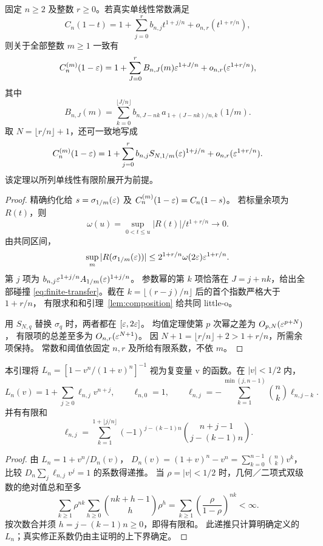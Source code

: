 \begin{theorem}[固定有限阶的条件性传递]\label{thm:finite-transfer}
固定 \(n\ge2\) 及整数 \(r\ge0\)。若真实单线性常数满足
\[
 C_n(1-t)=1+\sum_{j=0}^r b_{n,j}t^{1+j/n}
                         +o_{n,r}(t^{1+r/n}),
\]
则关于全部整数 \(m\ge1\) 一致有
\[
 C_n^{(m)}(1-\varepsilon)
 =1+\sum_{J=0}^r B_{n,J}(m)\varepsilon^{1+J/n}
                         +o_{n,r}(\varepsilon^{1+r/n}),
\]
其中
\begin{equation}\label{eq:finite-transfer}
 B_{n,J}(m)=
 \sum_{k=0}^{\lfloor J/n\rfloor}
 b_{n,J-nk}\,
 a_{\,1+(J-nk)/n,k}(1/m).
\end{equation}
取 \(N=\lfloor r/n\rfloor+1\)，还可一致地写成
\[
 C_n^{(m)}(1-\varepsilon)
 =1+\sum_{j=0}^r b_{n,j}S_{N,1/m}(\varepsilon)^{1+j/n}
                         +o_{n,r}(\varepsilon^{1+r/n}).
\]
该定理以所列单线性有限阶展开为前提。
\end{theorem}
\begin{proof}
精确约化给 \(s=\sigma_{1/m}(\varepsilon)\) 及
\(C_n^{(m)}(1-\varepsilon)=C_n(1-s)\)。
若标量余项为 \(R(t)\)，则
\[
 \omega(u)=\sup_{0<t\le u}|R(t)|/t^{1+r/n}\longrightarrow0.
\]
由共同区间，
\[
 \sup_m|R(\sigma_{1/m}(\varepsilon))|
 \le2^{1+r/n}\omega(2\varepsilon)\varepsilon^{1+r/n}.
\]
第 \(j\) 项为
\(b_{n,j}\varepsilon^{1+j/n}A_{1/m}(\varepsilon)^{1+j/n}\)。
参数幂的第 \(k\) 项恰落在 \(J=j+nk\)，给出全部碰撞
\eqref{eq:finite-transfer}。截在
\(k=\lfloor(r-j)/n\rfloor\) 后的首个指数严格大于 \(1+r/n\)，
有限求和和引理~\ref{lem:composition} 给共同 little-o。

用 \(S_{N,q}\) 替换 \(\sigma_q\) 时，两者都在 \([\varepsilon,2\varepsilon]\)。
均值定理使第 \(p\) 次幂之差为 \(O_{p,N}(\varepsilon^{p+N})\)，
有限项的总差至多为 \(O_{n,r}(\varepsilon^{N+1})\)。
因 \(N+1=\lfloor r/n\rfloor+2>1+r/n\)，所需余项保持。
常数和阈值依固定 \(n,r\) 及所给有限系数，不依 \(m\)。
\end{proof}

\begin{lemma}[周期基线的系数]\label{lem:baseline-recursion}
本引理将 \(L_n=[1-v^n/(1+v)^n]^{-1}\) 视为复变量 v 的函数。在 \(|v|<1/2\) 内，
\[
 L_n(v)=1+\sum_{j\ge0}\ell_{n,j}v^{n+j},\qquad
 \ell_{n,0}=1,\qquad
 \ell_{n,j}=-\sum_{k=1}^{\min(j,n-1)}
                    \binom nk\ell_{n,j-k}.
\]
并有有限和
\[
 \ell_{n,j}=
 \sum_{k=1}^{1+\lfloor j/n\rfloor}
 (-1)^{j-(k-1)n}\binom{n+j-1}{j-(k-1)n}.
\]
\end{lemma}
\begin{proof}
由 \(L_n=1+v^n/D_n(v)\)，
\(D_n(v)=(1+v)^n-v^n=\sum_{k=0}^{n-1}\binom nkv^k\)，
比较 \(D_n\sum_j\ell_{n,j}v^j=1\) 的系数得递推。
当 \(\rho=|v|<1/2\) 时，几何／二项式双级数的绝对值总和至多
\[
 \sum_{k\ge1}\rho^{nk}
 \sum_{h\ge0}\binom{nk+h-1}{h}\rho^h
 =\sum_{k\ge1}\left(\frac{\rho}{1-\rho}\right)^{nk}<\infty.
\]
按次数合并须 \(h=j-(k-1)n\ge0\)，即得有限和。
此递推只计算明确定义的 \(L_n\)；真实修正系数仍由主证明的上下界确定。
\end{proof}
